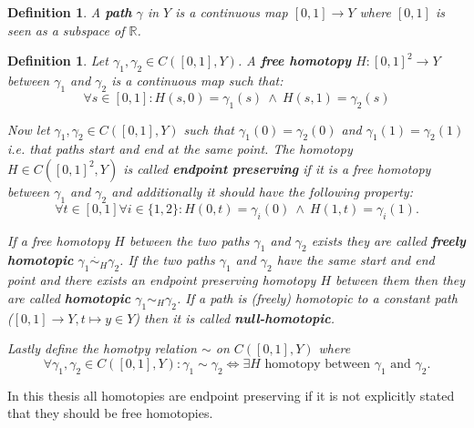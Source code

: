 \documentclass[a4paper, 11pt, twoside]{article}
\newcommand{\R}[0]{\mathbb{R}}
\theoremstyle{break}
\theoremstyle{break}
\newtheorem{defin}[thm]{Definition}
\begin{document}
\begin{defin}
  A \textbf{path} $\gamma$ in $Y$ is a continuous map $[0,1] \to Y$ where $[0,1]$ is seen as a subspace of $\R$.
\end{defin}

\begin{defin}
  Let $\gamma_1, \gamma_2 \in C([0, 1], Y)$. A \textbf{free homotopy} $H\colon [0,1]^2 \to Y$ between $\gamma_1$ and $\gamma_2$ is a continuous map such that:
  \begin{equation*}
    \forall s \in [0,1]: H(s, 0) = \gamma_1(s) \: \land \: H(s, 1) = \gamma_2(s)
  \end{equation*}

  Now let $\gamma_1, \gamma_2 \in C([0, 1], Y)$ such that $\gamma_1(0) = \gamma_2(0)$ and $\gamma_1(1) = \gamma_2(1)$ i.e. that paths start and end at the same point.
  The homotopy $H \in C([0,1]^2, Y)$ is called \textbf{endpoint preserving} if it is a free homotopy between $\gamma_1$ and $\gamma_2$ and additionally it should have the following property: 
  \begin{equation*}
    \forall t\in[0,1]\forall i\in \{1,2\}: H(0, t) = \gamma_i(0) \: \land \: H(1, t) = \gamma_i(1).
  \end{equation*}

  If a free homotopy $H$ between the two paths $\gamma_1$ and $\gamma_2$ exists they are called \textbf{freely homotopic} $\gamma_1 \overset{\cdot}{\sim}_H \gamma_2$.
  If the two paths $\gamma_1$ and $\gamma_2$ have the same start and end point and there exists an endpoint preserving homotopy $H$ between them then they are called 
  \textbf{homotopic} $\gamma_1 \sim_H \gamma_2$. If a path is (freely) homotopic to a constant path ($[0,1] \to Y, t \mapsto y \in Y$) then it is called \textbf{null-homotopic}.

  Lastly define the homotpy relation $\sim$ on $C([0,1], Y)$ where 
  \begin{equation*}
    \forall\gamma_1, \gamma_2 \in C([0,1], Y)\colon \gamma_1 \sim \gamma_2 \iff \exists H \text{ homotopy between } \gamma_1 \text{ and } \gamma_2.
  \end{equation*}
\end{defin}

In this thesis all homotopies are endpoint preserving if it is not explicitly stated that they should be free homotopies.
\end{document}
